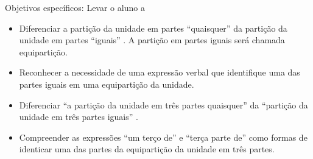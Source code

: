 \documentclass[a4paper,12pt,twoside]{book}
\begin{document}
\begin{professor*}[breakable]{}{}   Objetivos específicos: Levar o aluno a   
\begin{itemize} %
    \item       Diferenciar a partição da unidade em partes       ``quaisquer''       da partição da unidade em partes       ``iguais''      . A partição em partes iguais será chamada equipartição. 
    \item       Reconhecer a necessidade de uma expressão verbal que identifique uma das partes iguais em uma equipartição da unidade.
    \item       Diferenciar       ``a partição da unidade em três partes quaisquer''       da       ``partição da unidade em três partes iguais''      . 
    \item       Compreender as expressões       ``um terço de''       e       ``terça parte de''       como formas de identicar uma das partes da equipartição da unidade em três partes. 
\end{itemize} %
  
  
  

\end{professor*}
\end{document}
